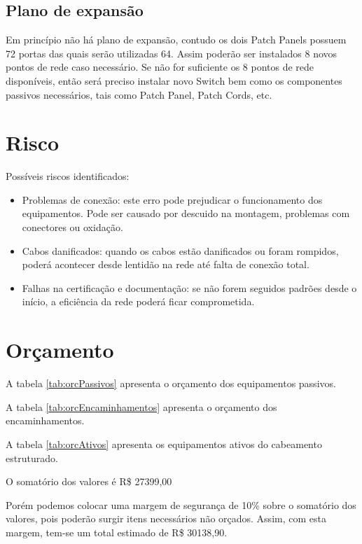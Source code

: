 \documentclass[	DIV=calc,%
							paper=a4,%
							fontsize=12pt,%
							onecolumn]{scrartcl}	 					%
\begin{document}
\subsection{Plano de expansão}

Em princípio não há plano de expansão, contudo os dois Patch Panels possuem 72 portas das quais serão utilizadas 64. Assim poderão ser instalados 8 novos pontos de rede caso necessário.
Se não for suficiente os 8 pontos de rede disponíveis, então será preciso instalar novo Switch bem como os componentes passivos necessários, tais como Patch Panel, Patch Cords, etc.

\section{Risco}

Possíveis riscos identificados:
\begin{itemize}
	\item Problemas de conexão: este erro pode prejudicar o funcionamento dos equipamentos. Pode ser causado por descuido na montagem, problemas com conectores ou oxidação. 
	\item Cabos danificados: quando os cabos estão danificados ou foram rompidos, poderá acontecer desde lentidão na rede até falta de conexão total. 
	\item Falhas na certificação e documentação: se não forem seguidos padrões desde o início, a eficiência da rede poderá ficar comprometida.
\end{itemize}

\section{Orçamento}

A tabela \ref{tab:orcPassivos} apresenta o orçamento dos equipamentos passivos.



A tabela \ref{tab:orcEncaminhamentos} apresenta o orçamento dos encaminhamentos.



A tabela \ref{tab:orcAtivos} apresenta os equipamentos ativos do cabeamento estruturado.



O somatório dos valores é R\$ 27399,00

Porém podemos colocar uma margem de segurança de 10\% sobre o somatório dos valores, pois poderão surgir itens necessários não orçados. Assim, com esta margem, tem-se um total estimado de R\$ 30138,90. 
\end{document}
